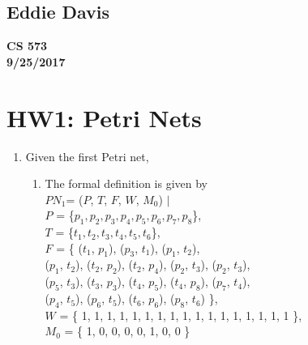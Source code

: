 \documentclass{bsu-ms}
\begin{document}
\subsection*{Eddie Davis}
\textbf{CS 573}\\
\textbf{9/25/2017}\\

\section*{HW1: Petri Nets}

\begin{enumerate}
	\item Given the first Petri net,
	\begin{enumerate}[label=(\alph*)]
		\item The formal definition is given by \\
		$PN_1$= ($P$, $T$, $F$, $W$, $M_0$) $\mid$ \\
		$P$ = \{$p_1, p_2, p_3, p_4, p_5, p_6, p_7, p_8$\}, \\
		$T$ = \{$t_1, t_2, t_3, t_4, t_5, t_6$\}, \\
		$F$ = \{ ($t_1$, $p_1$), ($p_3$, $t_1$), ($p_1$, $t_2$), \\
		($p_1$, $t_2$), ($t_2$, $p_2$), ($t_2$, $p_4$),
		($p_2$, $t_3$), ($p_2$, $t_3$), \\
		($p_5$, $t_3$), ($t_3$, $p_3$), ($t_4$, $p_5$),
		($t_4$, $p_8$), ($p_7$, $t_4$), \\ ($p_4$, $t_5$),
		($p_6$, $t_5$), ($t_6$, $p_6$), ($p_8$, $t_6$)
		 \}, \\
   	    $W$ = \{ 1, 1, 1, 1, 1, 1, 1, 1, 1, 1, 1, 1, 1, 1, 1, 1, 1 \}, \\
        $M_0$ = \{ 1, 0, 0, 0, 0, 1, 0, 0 \}


\end{enumerate}
\end{enumerate}
\end{document}
